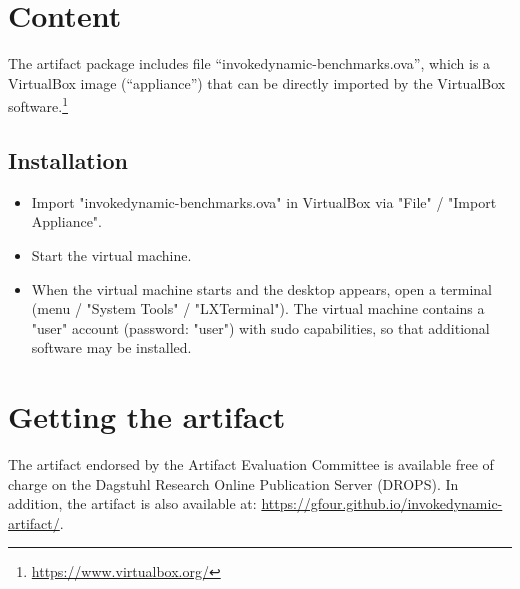\documentclass[a4paper,UKenglish]{darts-v2019}
\newenvironment{content}{\section{Content}}{}
\newenvironment{getting}{\section{Getting the artifact} The artifact 
endorsed by the Artifact Evaluation Committee is available free of 
charge on the Dagstuhl Research Online Publication Server (DROPS).}{}
\begin{document}
\begin{content}
The artifact package includes file ``invokedynamic-benchmarks.ova'',
which is a VirtualBox image (``appliance'') that can be directly
imported by the VirtualBox
software.\footnote{\url{https://www.virtualbox.org/}}

\subsection{Installation}
\label{sec:installation}

\begin{itemize}
\item Import "invokedynamic-benchmarks.ova" in VirtualBox via "File" / "Import
  Appliance".
\item Start the virtual machine.
\item When the virtual machine starts and the desktop appears, open a
  terminal (menu / "System Tools" / "LXTerminal"). The virtual
  machine contains a "user" account (password: "user") with sudo
  capabilities, so that additional software may be installed.
\end{itemize}

\end{content}

\begin{getting}
In addition, the artifact is also available at:
\url{https://gfour.github.io/invokedynamic-artifact/}.
\end{getting}
\end{document}
